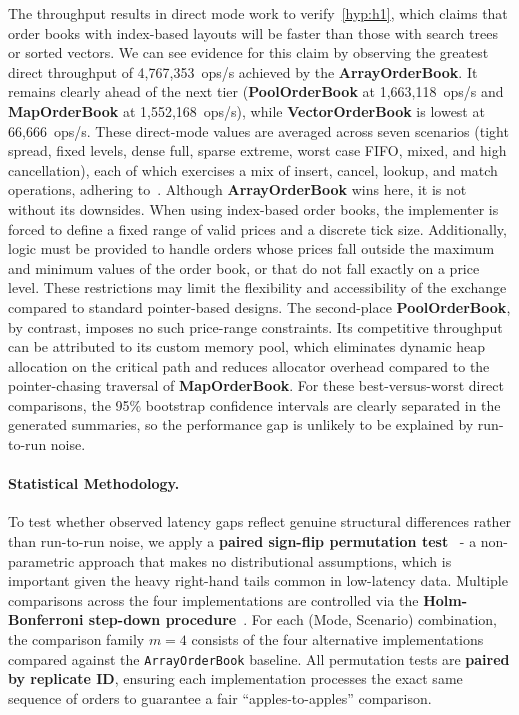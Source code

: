 The throughput results in direct mode work to verify~\ref{hyp:h1}, which
claims that order books with index-based layouts will be faster than those with
search trees or sorted vectors. We can see evidence for this claim by observing
the greatest direct throughput of 4,767,353~ops/s achieved by the
\textbf{ArrayOrderBook}. It remains clearly ahead of the next tier
(\textbf{PoolOrderBook} at 1,663,118~ops/s and \textbf{MapOrderBook} at
1,552,168~ops/s), while \textbf{VectorOrderBook} is lowest at 66,666~ops/s.
These direct-mode values are averaged across seven scenarios
(tight spread, fixed levels, dense full, sparse extreme, worst case FIFO, mixed,
and high cancellation), each of which exercises a mix of insert, cancel,
lookup, and match operations, adhering to~.
Although \textbf{ArrayOrderBook} wins here, it is not without its downsides.
When using index-based order books, the implementer is forced to define a fixed
range of valid prices and a discrete tick size. Additionally, logic must be
provided to handle orders whose prices fall outside the maximum and minimum
values of the order book, or that do not fall exactly on a price level.
These restrictions may limit the flexibility and accessibility of the exchange 
compared to standard pointer-based designs.
The second-place \textbf{PoolOrderBook}, by contrast, imposes no such
price-range constraints. Its competitive throughput can be attributed to
its custom memory pool, which eliminates dynamic heap allocation on
the critical path and reduces allocator overhead compared to the
pointer-chasing traversal of \textbf{MapOrderBook}.
For these best-versus-worst direct comparisons, the 95\% bootstrap confidence intervals are clearly
separated in the generated summaries, so the performance gap is unlikely to be
explained by run-to-run noise.

\paragraph{Statistical Methodology.}
\label{sec:statistical_methodology}
To test whether observed latency gaps reflect genuine structural differences 
rather than run-to-run noise, we apply a \textbf{paired sign-flip permutation 
test}~\citep{pitman1937significance} - a non-parametric approach that makes 
no distributional assumptions, which is important given the heavy right-hand 
tails common in low-latency data. Multiple comparisons across the four 
implementations are controlled via the \textbf{Holm-Bonferroni step-down 
procedure}~\citep{holm1979simple}. For each (Mode, Scenario) combination, the 
comparison family $m=4$ consists of the four alternative implementations 
compared against the \texttt{ArrayOrderBook} baseline. All permutation tests 
are \textbf{paired by replicate ID}, ensuring each implementation processes 
the exact same sequence of orders to guarantee a fair ``apples-to-apples'' 
comparison.


